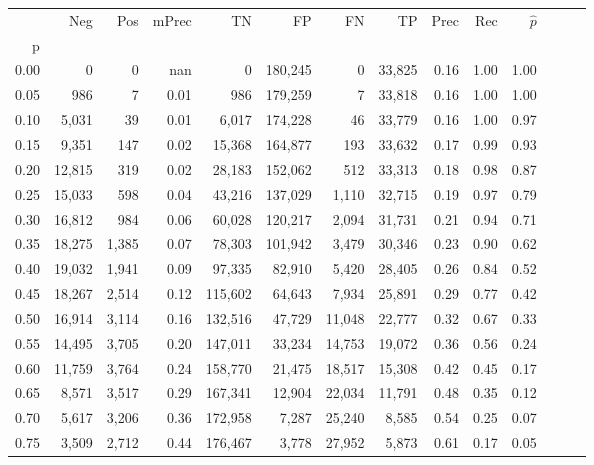 \begin{tabular}{rrrrrrrrrrrrrr}
\toprule
{} &     Neg &    Pos & mPrec &       TN &       FP &      FN &      TP &  Prec &   Rec & $\hat{p}$ \\
p    &         &        &       &          &          &         &         &       &       &           \\
\midrule
0.00 &       0 &      0 &   nan &        0 &  180,245 &       0 &  33,825 &  0.16 &  1.00 &      1.00 \\
0.05 &     986 &      7 &  0.01 &      986 &  179,259 &       7 &  33,818 &  0.16 &  1.00 &      1.00 \\
0.10 &   5,031 &     39 &  0.01 &    6,017 &  174,228 &      46 &  33,779 &  0.16 &  1.00 &      0.97 \\
0.15 &   9,351 &    147 &  0.02 &   15,368 &  164,877 &     193 &  33,632 &  0.17 &  0.99 &      0.93 \\
0.20 &  12,815 &    319 &  0.02 &   28,183 &  152,062 &     512 &  33,313 &  0.18 &  0.98 &      0.87 \\
0.25 &  15,033 &    598 &  0.04 &   43,216 &  137,029 &   1,110 &  32,715 &  0.19 &  0.97 &      0.79 \\
0.30 &  16,812 &    984 &  0.06 &   60,028 &  120,217 &   2,094 &  31,731 &  0.21 &  0.94 &      0.71 \\
0.35 &  18,275 &  1,385 &  0.07 &   78,303 &  101,942 &   3,479 &  30,346 &  0.23 &  0.90 &      0.62 \\
0.40 &  19,032 &  1,941 &  0.09 &   97,335 &   82,910 &   5,420 &  28,405 &  0.26 &  0.84 &      0.52 \\
0.45 &  18,267 &  2,514 &  0.12 &  115,602 &   64,643 &   7,934 &  25,891 &  0.29 &  0.77 &      0.42 \\
0.50 &  16,914 &  3,114 &  0.16 &  132,516 &   47,729 &  11,048 &  22,777 &  0.32 &  0.67 &      0.33 \\
0.55 &  14,495 &  3,705 &  0.20 &  147,011 &   33,234 &  14,753 &  19,072 &  0.36 &  0.56 &      0.24 \\
0.60 &  11,759 &  3,764 &  0.24 &  158,770 &   21,475 &  18,517 &  15,308 &  0.42 &  0.45 &      0.17 \\
0.65 &   8,571 &  3,517 &  0.29 &  167,341 &   12,904 &  22,034 &  11,791 &  0.48 &  0.35 &      0.12 \\
0.70 &   5,617 &  3,206 &  0.36 &  172,958 &    7,287 &  25,240 &   8,585 &  0.54 &  0.25 &      0.07 \\
0.75 &   3,509 &  2,712 &  0.44 &  176,467 &    3,778 &  27,952 &   5,873 &  0.61 &  0.17 &      0.05 \\

\end{tabular}
